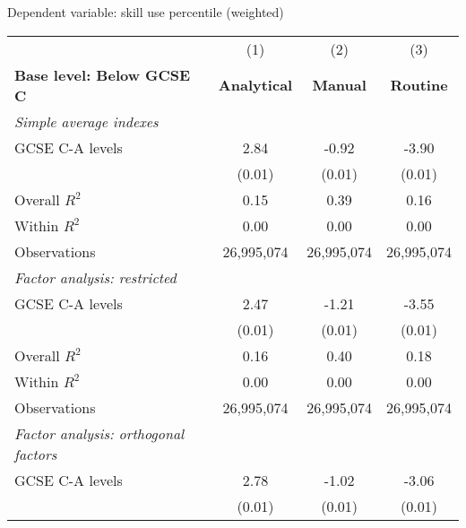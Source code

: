 \begin{center}
\begin{threeparttable}[!h]
\caption{Dependent variable: skill use percentile (weighted)}
\label{tab:skillRegs}
\begin{tabular}{lccc}
\toprule
\toprule
&\multicolumn{1}{c}{(1)}&\multicolumn{1}{c}{(2)}&\multicolumn{1}{c}{(3)} \\
\textbf{Base level: Below GCSE C}&\multicolumn{1}{c}{\textbf{Analytical}}&\multicolumn{1}{c}{\textbf{Manual}}&\multicolumn{1}{c}{\textbf{Routine}} \\
\midrule
\textit{Simple average indexes} \vspace{1mm}\\ 
\hspace{3mm}GCSE C-A levels&        2.84\sym{***}&       -0.92\sym{***}&       -3.90\sym{***}\\
                    &      (0.01)         &      (0.01)         &      (0.01)         \\
\midrule Overall $ R^2$&        0.15         &        0.39         &        0.16         \\
Within $ R^2$       &        0.00         &        0.00         &        0.00         \\
Observations        &  26,995,074         &  26,995,074         &  26,995,074         \\
\midrule\vspace{1mm} \textit{Factor analysis: restricted} \\ 
\hspace{3mm}GCSE C-A levels&        2.47\sym{***}&       -1.21\sym{***}&       -3.55\sym{***}\\
                    &      (0.01)         &      (0.01)         &      (0.01)         \\
\midrule Overall $ R^2$&        0.16         &        0.40         &        0.18         \\
Within $ R^2$       &        0.00         &        0.00         &        0.00         \\
Observations        &  26,995,074         &  26,995,074         &  26,995,074         \\
\midrule\vspace{1mm} \textit{Factor analysis: orthogonal factors} \\ 
\hspace{3mm}GCSE C-A levels&        2.78\sym{***}&       -1.02\sym{***}&       -3.06\sym{***}\\
                    &      (0.01)         &      (0.01)         &      (0.01)         \\

\end{tabular}
\end{threeparttable}
\end{center}
